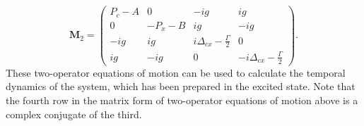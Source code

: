 \begin{equation}
\mathbf{M}_2=\left(\begin{array}{cccc}
P_c-A & 0 & -ig & ig\\
0 & -P_x-B & ig & -ig\\
-ig & ig & i\Delta_{cx}-\frac{\Gamma}{2} & 0\\
 ig & -ig & 0 &-i\Delta_{cx}-\frac{\Gamma}{2}\end{array} \right).
\end{equation}
These two-operator equations of motion can be used to calculate the temporal dynamics of the system, which has been prepared in the excited state.  Note that the fourth row in the matrix form of two-operator equations of motion above is a complex conjugate of the third. 

